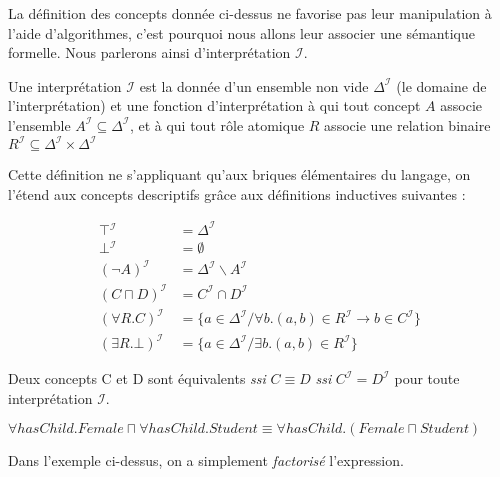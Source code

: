 
% 

% 

\par La définition des concepts  donnée ci-dessus ne favorise pas leur manipulation à l'aide d'algorithmes, c'est pourquoi nous allons leur associer une sémantique formelle. Nous parlerons ainsi d'interprétation $\mathcal{I}$.

{Une interprétation $\mathcal{I}$ est la donnée d'un ensemble non vide $\Delta^\mathcal{I}$ (le domaine de l'interprétation) et une fonction d'interprétation à qui tout concept $A$ associe l'ensemble $A^\mathcal{I} \subseteq \Delta^\mathcal{I}$, et à qui tout rôle atomique $R$ associe une relation binaire $R^\mathcal{I} \subseteq \Delta^\mathcal{I} \times \Delta^\mathcal{I}$}

\par Cette définition ne s'appliquant qu'aux briques élémentaires du langage, on l'étend aux concepts descriptifs grâce aux définitions inductives suivantes :


\begin{align}
  \top{}^\mathcal{I} & = \Delta^\mathcal{I} \\
  \bot{}^\mathcal{I} & = \emptyset \\
  (\neg{}A)^\mathcal{I} & = \Delta^\mathcal{I}\backslash A^\mathcal{I}\\
  (C \sqcap D)^\mathcal{I} & = C^\mathcal{I} \cap D^\mathcal{I} \\
  ( \forall R.C )^\mathcal{I} & = \{ a \in \Delta^\mathcal{I} / \forall b.(a,b) \in R^\mathcal{I} \longrightarrow b \in C^\mathcal{I} \} \\
  ( \exists R.\bot )^\mathcal{I} & = \{ a \in \Delta^\mathcal{I} / \exists b.(a,b) \in R^\mathcal{I} \}
\end{align}

{Deux concepts C et D  sont équivalents \emph{ssi} $C\equiv D$ \emph{ssi} $C^\mathcal{I} = D^\mathcal{I}$ pour toute interprétation $\mathcal{I}$. }

\begin{exemple}
  $\forall hasChild.Female \sqcap \forall hasChild.Student \equiv \forall hasChild.(Female \sqcap Student)$
\end{exemple}

\par Dans l'exemple ci-dessus, on a simplement \emph{factorisé} l'expression.

